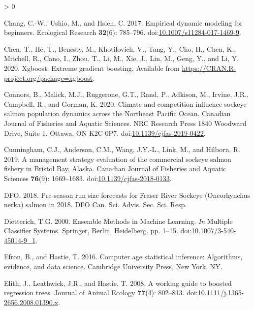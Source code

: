 \documentclass[
]{article}
\newlength{\cslhangindent}
\newenvironment{CSLReferences}[2] %
 {%
  \setlength{\parindent}{0pt}
  \ifodd #1 \everypar{\setlength{\hangindent}{\cslhangindent}}\ignorespaces\fi
  \ifnum #2 > 0
  \setlength{\parskip}{#2\baselineskip}
  \fi
 }%
 {}
\begin{document}
\begin{CSLReferences}{1}{0}
\leavevmode\hypertarget{ref-chang2017}{}%
Chang, C.-W., Ushio, M., and Hsieh, C. 2017. Empirical dynamic modeling for beginners. Ecological Research \textbf{32}(6): 785--796. doi:\href{https://doi.org/10.1007/s11284-017-1469-9}{10.1007/s11284-017-1469-9}.

\leavevmode\hypertarget{ref-chen2020}{}%
Chen, T., He, T., Benesty, M., Khotilovich, V., Tang, Y., Cho, H., Chen, K., Mitchell, R., Cano, I., Zhou, T., Li, M., Xie, J., Lin, M., Geng, Y., and Li, Y. 2020. Xgboost: Extreme gradient boosting. Available from \url{https://CRAN.R-project.org/package=xgboost}.

\leavevmode\hypertarget{ref-connors2020}{}%
Connors, B., Malick, M.J., Ruggerone, G.T., Rand, P., Adkison, M., Irvine, J.R., Campbell, R., and Gorman, K. 2020. Climate and competition influence sockeye salmon population dynamics across the {Northeast Pacific Ocean}. Canadian Journal of Fisheries and Aquatic Sciences. {NRC Research Press 1840 Woodward Drive, Suite 1, Ottawa, ON K2C 0P7}. doi:\href{https://doi.org/10.1139/cjfas-2019-0422}{10.1139/cjfas-2019-0422}.

\leavevmode\hypertarget{ref-cunningham2019}{}%
Cunningham, C.J., Anderson, C.M., Wang, J.Y.-L., Link, M., and Hilborn, R. 2019. A management strategy evaluation of the commercial sockeye salmon fishery in {Bristol Bay}, {Alaska}. Canadian Journal of Fisheries and Aquatic Sciences \textbf{76}(9): 1669--1683. doi:\href{https://doi.org/10.1139/cjfas-2018-0133}{10.1139/cjfas-2018-0133}.

\leavevmode\hypertarget{ref-dfo2018}{}%
DFO. 2018. Pre-season run size forecasts for {Fraser River Sockeye} ({Oncorhynchus} nerka) salmon in 2018. {DFO Can. Sci. Advis. Sec. Sci. Resp}.

\leavevmode\hypertarget{ref-Dietterich2000}{}%
Dietterich, T.G. 2000. Ensemble {Methods} in {Machine Learning}. \emph{In} Multiple {Classifier Systems}. {Springer, Berlin, Heidelberg}. pp. 1--15. doi:\href{https://doi.org/10.1007/3-540-45014-9_1}{10.1007/3-540-45014-9\_1}.

\leavevmode\hypertarget{ref-efron2016}{}%
Efron, B., and Hastie, T. 2016. Computer age statistical inference: Algorithms, evidence, and data science. {Cambridge University Press}, {New York, NY}.

\leavevmode\hypertarget{ref-elith2008}{}%
Elith, J., Leathwick, J.R., and Hastie, T. 2008. A working guide to boosted regression trees. Journal of Animal Ecology \textbf{77}(4): 802--813. doi:\href{https://doi.org/10.1111/j.1365-2656.2008.01390.x}{10.1111/j.1365-2656.2008.01390.x}.


\end{CSLReferences}
\end{document}
